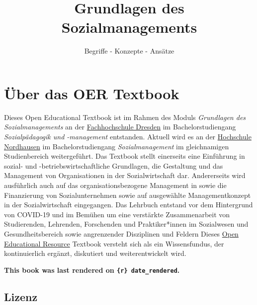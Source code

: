 \documentclass[
  letterpaper,
]{book}
\title{Grundlagen des Sozialmanagements}
\subtitle{Begriffe - Konzepte - Ansätze}
\author{}
\date{}
\renewcommand*\contentsname{Table of contents}
\newcommand\contentsname{Table of contents}
\begin{document}
\frontmatter
\maketitle

\renewcommand*\contentsname{Table of contents}
{
\hypersetup{linkcolor=}
\setcounter{tocdepth}{2}
\tableofcontents
}

\mainmatter
{}

\chapter*{Über das OER Textbook}\label{uxfcber-das-oer-textbook}


Dieses Open Educational Textbook ist im Rahmen des Moduls
\emph{Grundlagen des Sozialmanagements} an der
\href{https://www.fh-dresden.de}{Fachhochschule Dresden} im
Bachelorstudiengang \emph{Sozialpädagogik und -management} entstanden.
Aktuell wird es an der \href{https://www.hs-nordhausen.de}{Hochschule
Nordhausen} im Bachelorstudiengang \emph{Sozialmanagement} im
gleichnamigen Studienbereich weitergeführt. Das Textbook stellt
einerseits eine Einführung in sozial- und -betriebswirtschaftliche
Grundlagen, die Gestaltung und das Management von Organisationen in der
Sozialwirtschaft dar. Andererseits wird ausführlich auch auf das
organisationsbezogene Management in sowie die Finanzierung von
Sozialunternehmen sowie auf ausgewählte Managementkonzept in der
Sozialwirtschaft eingegangen. Das Lehrbuch entstand vor dem Hintergrund
von COVID-19 und im Bemühen um eine verstärkte Zusammenarbeit von
Studierenden, Lehrenden, Forschenden und Praktiker*innen im Sozialwesen
und Gesundheitsbereich sowie angrenzender Disziplinen und Feldern Dieses
\href{https://de.wikipedia.org/wiki/Open_Educational_Resources}{Open
Educational Resource} Textbook versteht sich als ein Wissensfundus, der
kontinuierlich ergänzt, diskutiert und weiterentwickelt wird.

\textbf{This book was last rendered on \texttt{\{r\}\ date\_rendered}.}

\section*{Lizenz}\label{lizenz}

\end{document}
